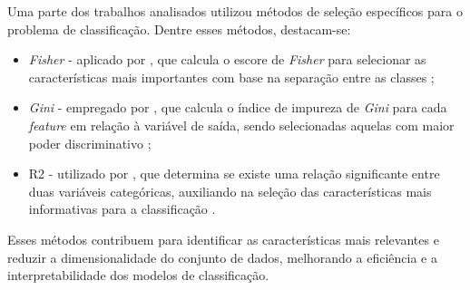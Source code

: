 Uma parte dos trabalhos analisados utilizou métodos de seleção específicos para o problema de classificação. Dentre esses métodos, destacam-se:
\begin{itemize}
    \item \textit{Fisher} - aplicado por , que calcula o escore de \textit{Fisher} para selecionar as características mais importantes com base na separação entre as classes \cite{fisher1936use};

    \item  \textit{Gini} - empregado por , que calcula o índice de impureza de \textit{Gini} para cada \textit{feature} em relação à variável de saída, sendo selecionadas aquelas com maior poder discriminativo \cite{gini1921measurement}; 

    \item \ac{R2} - utilizado por , que determina se existe uma relação significante entre duas variáveis categóricas, auxiliando na seleção das características mais informativas para a classificação \cite{pearson1900x}.
\end{itemize}
 Esses métodos contribuem para identificar as características mais relevantes e reduzir a dimensionalidade do conjunto de dados, melhorando a eficiência e a interpretabilidade dos modelos de classificação.

